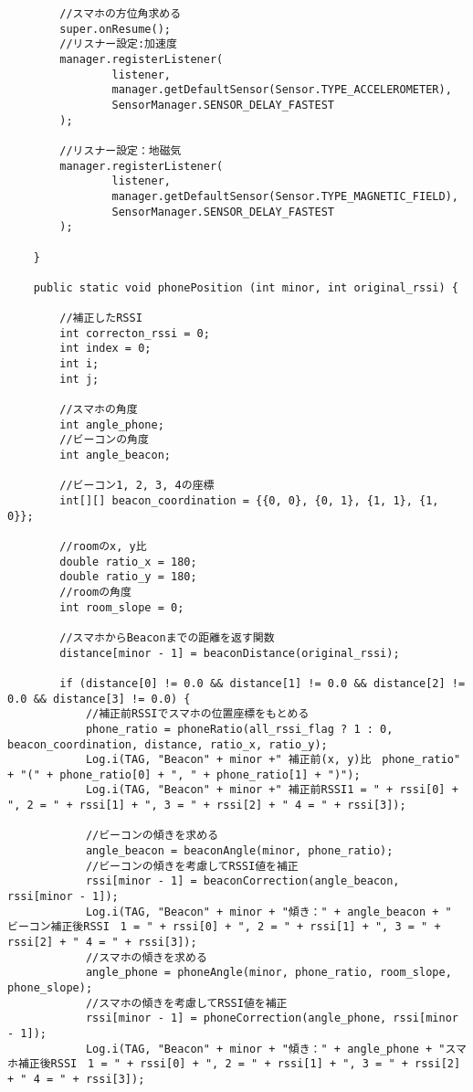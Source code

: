 \documentclass[11pt,a4j]{jarticle}
\begin{document}
\begin{verbatim}
        //スマホの方位角求める
        super.onResume();
        //リスナー設定:加速度
        manager.registerListener(
                listener,
                manager.getDefaultSensor(Sensor.TYPE_ACCELEROMETER),
                SensorManager.SENSOR_DELAY_FASTEST
        );

        //リスナー設定：地磁気
        manager.registerListener(
                listener,
                manager.getDefaultSensor(Sensor.TYPE_MAGNETIC_FIELD),
                SensorManager.SENSOR_DELAY_FASTEST
        );

    }

    public static void phonePosition (int minor, int original_rssi) {

        //補正したRSSI
        int correcton_rssi = 0;
        int index = 0;
        int i;
        int j;

        //スマホの角度
        int angle_phone;
        //ビーコンの角度
        int angle_beacon;

        //ビーコン1, 2, 3, 4の座標
        int[][] beacon_coordination = {{0, 0}, {0, 1}, {1, 1}, {1, 0}};

        //roomのx, y比
        double ratio_x = 180;
        double ratio_y = 180;
        //roomの角度
        int room_slope = 0;

        //スマホからBeaconまでの距離を返す関数
        distance[minor - 1] = beaconDistance(original_rssi);

        if (distance[0] != 0.0 && distance[1] != 0.0 && distance[2] != 0.0 && distance[3] != 0.0) {
            //補正前RSSIでスマホの位置座標をもとめる
            phone_ratio = phoneRatio(all_rssi_flag ? 1 : 0, beacon_coordination, distance, ratio_x, ratio_y);
            Log.i(TAG, "Beacon" + minor +" 補正前(x, y)比　phone_ratio" + "(" + phone_ratio[0] + ", " + phone_ratio[1] + ")");
            Log.i(TAG, "Beacon" + minor +" 補正前RSSI1 = " + rssi[0] + ", 2 = " + rssi[1] + ", 3 = " + rssi[2] + " 4 = " + rssi[3]);

            //ビーコンの傾きを求める
            angle_beacon = beaconAngle(minor, phone_ratio);
            //ビーコンの傾きを考慮してRSSI値を補正
            rssi[minor - 1] = beaconCorrection(angle_beacon, rssi[minor - 1]);
            Log.i(TAG, "Beacon" + minor + "傾き：" + angle_beacon + " ビーコン補正後RSSI　1 = " + rssi[0] + ", 2 = " + rssi[1] + ", 3 = " + rssi[2] + " 4 = " + rssi[3]);
            //スマホの傾きを求める
            angle_phone = phoneAngle(minor, phone_ratio, room_slope, phone_slope);
            //スマホの傾きを考慮してRSSI値を補正
            rssi[minor - 1] = phoneCorrection(angle_phone, rssi[minor - 1]);
            Log.i(TAG, "Beacon" + minor + "傾き：" + angle_phone + "スマホ補正後RSSI　1 = " + rssi[0] + ", 2 = " + rssi[1] + ", 3 = " + rssi[2] + " 4 = " + rssi[3]);


\end{verbatim}
\end{document}
